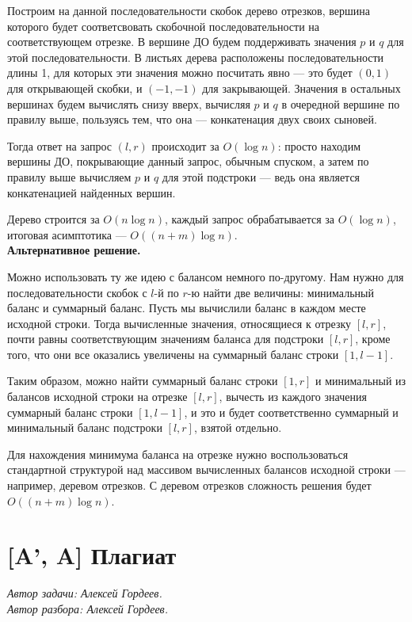 \documentclass[12pt]{article}
\theoremstyle{definition}
\begin{document}
Построим на данной последовательности скобок дерево отрезков, вершина которого будет соответсвовать скобочной последовательности на соответствующем отрезке.
В вершине ДО будем поддерживать значения $p$ и $q$ для этой последовательности. В листьях дерева расположены последовательности длины 1, для которых эти значения
можно посчитать явно --- это будет $(0, 1)$ для открывающей скобки, и $(-1, -1)$ для закрывающей.
Значения в остальных вершинах будем вычислять снизу вверх, вычисляя $p$ и $q$ в очередной вершине по правилу выше, пользуясь тем, что она --- конкатенация двух своих сыновей.

Тогда ответ на запрос $(l, r)$ происходит за $O(\log n)$: просто находим вершины ДО, покрывающие данный запрос, обычным спуском, а затем по правилу выше вычисляем $p$ и $q$ для этой подстроки --- ведь она является конкатенацией найденных вершин.

Дерево строится за $O(n \log n)$, каждый запрос обрабатывается за $O(\log n)$, итоговая асимптотика --- $O( (n + m) \log n)$. \\

\textbf{Альтернативное решение.}

Можно использовать ту же идею с балансом немного по-другому. Нам нужно для последовательности скобок с $l$-й по $r$-ю найти две величины: минимальный баланс и суммарный баланс.
Пусть мы вычислили баланс в каждом месте исходной строки. Тогда вычисленные значения, относящиеся к отрезку $[l, r]$, почти равны соответствующим значениям баланса для
подстроки $[l, r]$, кроме того, что они все оказались увеличены на суммарный баланс строки $[1, l - 1]$.

Таким образом, можно найти суммарный баланс строки $[1, r]$
и минимальный из балансов исходной строки на отрезке $[l, r]$, вычесть из каждого значения суммарный баланс строки $[1, l - 1]$, и это и будет соответственно суммарный и минимальный баланс подстроки $[l, r]$, взятой отдельно.

Для нахождения минимума баланса на отрезке нужно воспользоваться стандартной структурой над массивом вычисленных балансов исходной строки --- например, деревом отрезков. С деревом отрезков сложность решения будет $O( (n + m) \log n)$.

\pagebreak

\section{[A', A] Плагиат}
\textit{Автор задачи: Алексей Гордеев.} \\
\textit{Автор разбора: Алексей Гордеев.}
\end{document}
